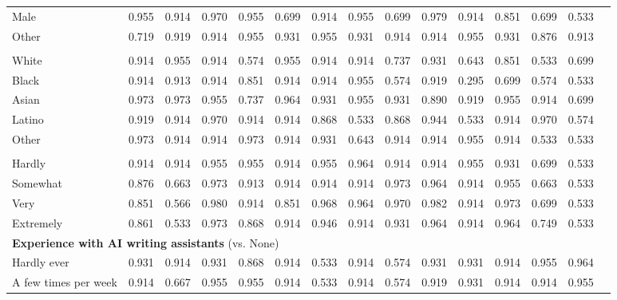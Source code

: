 \documentclass[11pt]{report}
\begin{document}
\begin{append}
\begin{table}[ht]
\begin{tabular}{@{\extracolsep{-4pt}}lcccccccccccccc}
    \midrule
    \addlinespace[2.5pt]
    \multicolumn{14}{l}{\textbf{Gender} (vs. Female)} \\ 
    \midrule
    Male            & 0.955 & 0.914 & 0.970 & 0.955 & 0.699 & 0.914 & 0.955 & 0.699 & 0.979 & 0.914 & 0.851 & 0.699 & 0.533 \\ 
    Other           & 0.719 & 0.919 & 0.914 & 0.955 & 0.931 & 0.955 & 0.931 & 0.914 & 0.914 & 0.955 & 0.931 & 0.876 & 0.913 \\ 
    \midrule
    \addlinespace[2.5pt]
    \multicolumn{14}{l}{\textbf{Race}} \\ 
    \midrule
    White           & 0.914 & 0.955 & 0.914 & 0.574 & 0.955 & 0.914 & 0.914 & 0.737 & 0.931 & 0.643 & 0.851 & 0.533 & 0.699 \\ 
    Black           & 0.914 & 0.913 & 0.914 & 0.851 & 0.914 & 0.914 & 0.955 & 0.574 & 0.919 & 0.295 & 0.699 & 0.574 & 0.533 \\ 
    Asian           & 0.973 & 0.973 & 0.955 & 0.737 & 0.964 & 0.931 & 0.955 & 0.931 & 0.890 & 0.919 & 0.955 & 0.914 & 0.699 \\ 
    Latino          & 0.919 & 0.914 & 0.970 & 0.914 & 0.914 & 0.868 & 0.533 & 0.868 & 0.944 & 0.533 & 0.914 & 0.970 & 0.574 \\ 
    Other           & 0.973 & 0.914 & 0.914 & 0.973 & 0.914 & 0.931 & 0.643 & 0.914 & 0.914 & 0.955 & 0.914 & 0.533 & 0.533 \\ 
    \midrule
    \addlinespace[2.5pt]
    \multicolumn{14}{l}{\textbf{Motivation} (vs. Not at all)} \\ 
    \midrule
    Hardly          & 0.914 & 0.914 & 0.955 & 0.955 & 0.914 & 0.955 & 0.964 & 0.914 & 0.914 & 0.955 & 0.931 & 0.699 & 0.533 \\ 
    Somewhat        & 0.876 & 0.663 & 0.973 & 0.913 & 0.914 & 0.914 & 0.914 & 0.973 & 0.964 & 0.914 & 0.955 & 0.663 & 0.533 \\ 
    Very            & 0.851 & 0.566 & 0.980 & 0.914 & 0.851 & 0.968 & 0.964 & 0.970 & 0.982 & 0.914 & 0.973 & 0.699 & 0.533 \\ 
    Extremely       & 0.861 & 0.533 & 0.973 & 0.868 & 0.914 & 0.946 & 0.914 & 0.931 & 0.964 & 0.914 & 0.964 & 0.749 & 0.533 \\ \midrule
    \multicolumn{14}{l}{\textbf{Experience with AI writing assistants} (vs. None)} \\ 
\midrule
Hardly ever & 0.931 & 0.914 & 0.931 & 0.868 & 0.914 & 0.533 & 0.914 & 0.574 & 0.931 & 0.931 & 0.914 & 0.955 & 0.964 \\ 
A few times per week     & 0.914 & 0.667 & 0.955 & 0.955 & 0.914 & 0.533 & 0.914 & 0.574 & 0.919 & 0.931 & 0.914 & 0.914 & 0.955 \\ 

\end{tabular}
\end{table}
\end{append}
\end{document}
